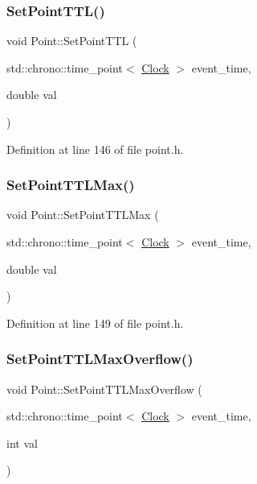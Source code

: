 \subsubsection{\texorpdfstring{Set\+Point\+T\+T\+L()}{SetPointTTL()}}
{\footnotesize\ttfamily void Point\+::\+Set\+Point\+T\+TL (\begin{DoxyParamCaption}\item[{std\+::chrono\+::time\+\_\+point$<$ \hyperlink{universe_8h_a0ef8d951d1ca5ab3cfaf7ab4c7a6fd80}{Clock} $>$}]{event\+\_\+time,  }\item[{double}]{val }\end{DoxyParamCaption})\hspace{0.3cm}{\ttfamily [inline]}}



Definition at line 146 of file point.\+h.

\mbox{\label{class_point_a1227b110f1fa0aab599f9374ea5ec484}} 
\subsubsection{\texorpdfstring{Set\+Point\+T\+T\+L\+Max()}{SetPointTTLMax()}}
{\footnotesize\ttfamily void Point\+::\+Set\+Point\+T\+T\+L\+Max (\begin{DoxyParamCaption}\item[{std\+::chrono\+::time\+\_\+point$<$ \hyperlink{universe_8h_a0ef8d951d1ca5ab3cfaf7ab4c7a6fd80}{Clock} $>$}]{event\+\_\+time,  }\item[{double}]{val }\end{DoxyParamCaption})\hspace{0.3cm}{\ttfamily [inline]}}



Definition at line 149 of file point.\+h.

\mbox{\label{class_point_a6a7ca43c551232d5c5d0f5a5d8603c9e}} 
\subsubsection{\texorpdfstring{Set\+Point\+T\+T\+L\+Max\+Overflow()}{SetPointTTLMaxOverflow()}}
{\footnotesize\ttfamily void Point\+::\+Set\+Point\+T\+T\+L\+Max\+Overflow (\begin{DoxyParamCaption}\item[{std\+::chrono\+::time\+\_\+point$<$ \hyperlink{universe_8h_a0ef8d951d1ca5ab3cfaf7ab4c7a6fd80}{Clock} $>$}]{event\+\_\+time,  }\item[{int}]{val }\end{DoxyParamCaption})\hspace{0.3cm}{\ttfamily [inline]}}



